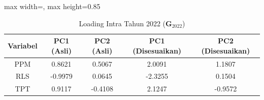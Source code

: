\begin{table}[H]
\centering
\caption{Loading Intra Tahun 2022 ($\mathbf{G}_{2022}$)} \makeatletter{}\makeatother
\begin{adjustbox}{max width=\textwidth, max height=0.85\textheight}
\begin{tabular}{|c|c|c|c|c|}
\hline
\textbf{Variabel} & \textbf{PC1 (Asli)} & \textbf{PC2 (Asli)} & \textbf{PC1 (Disesuaikan)} & \textbf{PC2 (Disesuaikan)} \\
\hline
PPM & 0.8621 & 0.5067 & 2.0091 & 1.1807 \\
RLS & -0.9979 & 0.0645 & -2.3255 & 0.1504 \\
TPT & 0.9117 & -0.4108 & 2.1247 & -0.9572 \\
\hline
\end{tabular}
\end{adjustbox}
\end{table}